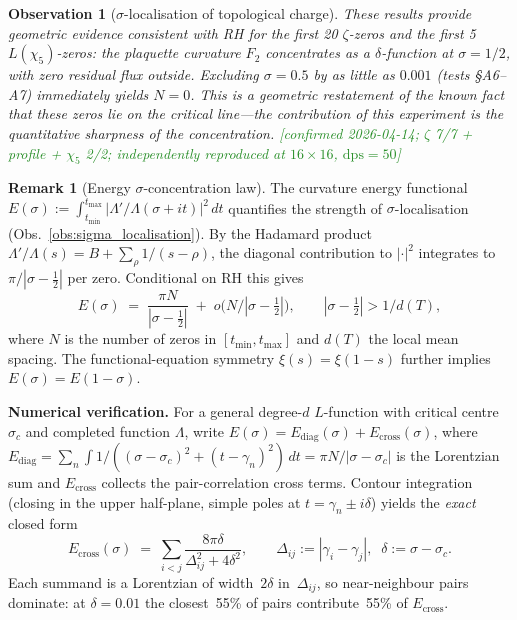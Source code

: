 \documentclass[11pt, a4paper]{article}
\theoremstyle{definition}
\newtheorem{remark}{Remark}[section]
\theoremstyle{plain}
\newtheorem{observation}[theorem]{Observation}
\begin{document}
\begin{observation}[$\sigma$-localisation of topological charge]
\smallskip\noindent
These results provide geometric evidence consistent with RH
for the first 20 $\zeta$-zeros and the first 5 $L(\chi_5)$-zeros:
the plaquette curvature $F_2$ concentrates as a
$\delta$-function at $\sigma=1/2$, with zero residual flux
outside.  Excluding $\sigma=0.5$ by as little as $0.001$
(tests \S A6--A7) immediately yields $N=0$.
This is a geometric restatement of the known fact that these
zeros lie on the critical line---the contribution of this
experiment is the \emph{quantitative sharpness} of the
concentration.
\textcolor{ForestGreen}{[confirmed 2026-04-14; $\zeta$ 7/7 + profile + $\chi_5$ 2/2;
independently reproduced at $16\!\times\!16$, $\mathrm{dps}=50$]}
\end{observation}


\begin{remark}[Energy $\sigma$-concentration law]
\label{rem:energy_sigma_concentration}
The curvature energy functional
$E(\sigma):=\int_{t_{\min}}^{t_{\max}}|\Lambda'/\Lambda(\sigma+it)|^{2}\,dt$
quantifies the strength of $\sigma$-localisation
(Obs.~\ref{obs:sigma_localisation}).
By the Hadamard product $\Lambda'/\Lambda(s)=B+\sum_{\rho}1/(s-\rho)$,
the diagonal contribution to $|{\cdot}|^{2}$ integrates to
$\pi/|\sigma-\tfrac{1}{2}|$ per zero.  Conditional on RH this gives
\[
  E(\sigma)\;=\;\frac{\pi N}{|\sigma-\tfrac{1}{2}|}
    \;+\;o\!\bigl(N/|\sigma-\tfrac{1}{2}|\bigr),
  \qquad |\sigma-\tfrac{1}{2}|>1/d(T),
\]
where $N$ is the number of zeros in $[t_{\min},t_{\max}]$ and $d(T)$
the local mean spacing.
The functional-equation symmetry $\xi(s)=\xi(1-s)$ further implies
$E(\sigma)=E(1-\sigma)$.

\smallskip\noindent
\textbf{Numerical verification.}\;
For a general degree-$d$ $L$-function with critical centre $\sigma_c$
and completed function $\Lambda$, write
$E(\sigma)=E_{\mathrm{diag}}(\sigma)+E_{\mathrm{cross}}(\sigma)$,
where $E_{\mathrm{diag}}=\sum_n\int 1/((\sigma-\sigma_c)^{2}+(t-\gamma_n)^{2})\,dt
=\pi N/|\sigma-\sigma_c|$ is the Lorentzian sum
and $E_{\mathrm{cross}}$ collects the pair-correlation cross terms.
Contour integration (closing in the upper half-plane, simple poles at
$t=\gamma_n\pm i\delta$) yields the \emph{exact} closed form
\begin{equation}\label{eq:cross_term_exact}
  E_{\mathrm{cross}}(\sigma)
    \;=\; \sum_{i<j} \frac{8\pi\delta}{\Delta_{ij}^{2}+4\delta^{2}},
  \qquad \Delta_{ij}:=|\gamma_i-\gamma_j|,\;\;
  \delta:=\sigma-\sigma_c.
\end{equation}
Each summand is a Lorentzian of width~$2\delta$ in~$\Delta_{ij}$,
so near-neighbour pairs dominate: at $\delta=0.01$
the closest~55\% of pairs contribute~55\% of $E_{\mathrm{cross}}$.


\end{remark}
\end{document}
